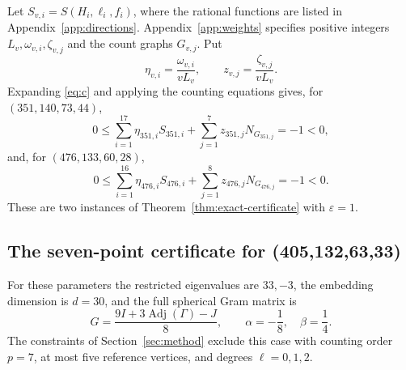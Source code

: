 \documentclass[11pt]{article}
\theoremstyle{remark}
\numberwithin{equation}{section}
\begin{document}
Let $S_{v,i}=S(H_i,\ell_i,f_i)$, where the rational functions are
listed in Appendix~\ref{app:directions}. Appendix~\ref{app:weights}
specifies positive integers $L_v,\omega_{v,i},\zeta_{v,j}$ and the
count graphs $G_{v,j}$. Put
\[
 \eta_{v,i}=\frac{\omega_{v,i}}{vL_v},\qquad
 z_{v,j}=\frac{\zeta_{v,j}}{vL_v}.
\]
Expanding \eqref{eq:c} and applying the counting equations gives,
for $(351,140,73,44)$,
\begin{equation}\label{eq:six351-explicit}
 0\le\sum_{i=1}^{17}\eta_{351,i}S_{351,i}
       +\sum_{j=1}^{7}z_{351,j}N_{G_{351,j}}=-1<0,
\end{equation}
and, for $(476,133,60,28)$,
\begin{equation}\label{eq:six476-explicit}
 0\le\sum_{i=1}^{16}\eta_{476,i}S_{476,i}
       +\sum_{j=1}^{8}z_{476,j}N_{G_{476,j}}=-1<0.
\end{equation}
These are two instances of Theorem~\ref{thm:exact-certificate}
with $\varepsilon=1$.

\subsection{The seven-point certificate for (405,132,63,33)}
\label{subsec:405-counting}
For these parameters the restricted eigenvalues are $33,-3$,
the embedding dimension is $d=30$, and the full spherical Gram matrix is
\[
 G=\frac{9I+3\operatorname{Adj}(\Gamma)-J}{8},\qquad
 \alpha=-\frac18,\quad\beta=\frac14.
\]
The constraints of Section~\ref{sec:method} exclude this case with
counting order $p=7$, at most five reference vertices, and degrees
$\ell=0,1,2$.  
\end{document}
